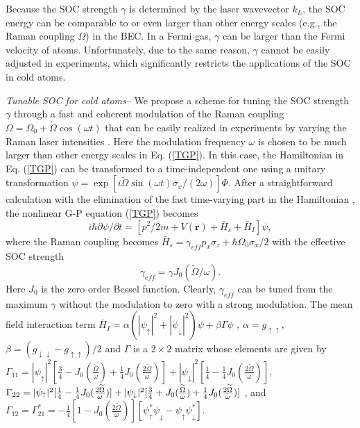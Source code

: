\documentclass[prl,twocolumn,superscriptaddress,showpacs,floatfix]{revtex4}
\begin{document}
Because the SOC strength $\gamma $ is determined by the laser wavevector $%
k_{L}$, the SOC energy can be comparable to or even larger than other energy
scales (e.g., the Raman coupling $\Omega $) in the BEC. In a Fermi gas, $%
\gamma $ can be larger than the Fermi velocity of atoms. Unfortunately, due
to the same reason, $\gamma $ cannot be easily adjusted in experiments,
which significantly restricts the applications of the SOC in cold atoms.

\textit{Tunable SOC for cold atoms}-- We propose a scheme for tuning the SOC
strength $\gamma $ through a fast and coherent modulation of the Raman
coupling $\Omega =\Omega _{0}+\widetilde{\Omega }\cos (\omega t)$ that can
be easily realized in experiments by varying the Raman laser intensities
\cite{Note}. Here the modulation frequency $\omega $ is chosen to be much
larger than other energy scales in Eq. (\ref{TGP}). In this case, the
Hamiltonian in Eq. (\ref{TGP}) can be transformed to a time-independent one
using a unitary transformation $\psi =\exp [i\widetilde{\Omega }\sin (\omega
t)\sigma _{x}/(2\omega )]\Phi $. After a straightforward calculation with
the elimination of the fast time-varying part in the Hamiltonian \cite%
{Eckardt,Lignier}, the nonlinear G-P equation (\ref{TGP}) becomes
\begin{equation}
i\hbar \partial \psi /\partial t=\left[ p^{2}/2m+V\left( \mathbf{r}\right) +%
\bar{H}_{s}+\bar{H}_{I}\right] \psi ,  \label{TCPS}
\end{equation}%
where the Raman coupling becomes $\bar{H}_{s}=\gamma _{eff}p_{x}\sigma
_{z}+\hbar \Omega _{0}\sigma _{x}/2$ with the effective SOC strength
\begin{equation}
\gamma _{eff}=\gamma J_{0}(\widetilde{\Omega }/\omega ).  \label{SOCS}
\end{equation}%
Here $J_{0}$ is the zero order Bessel function. Clearly, $\gamma _{eff}$ can
be tuned from the maximum $\gamma $ without the modulation to zero with a
strong modulation. The mean field interaction term $\bar{H}_{I}=\alpha
(|\psi _{\uparrow }|^{2}+|\psi _{\downarrow }|^{2})\psi +\beta \Gamma \psi $%
, $\alpha =g_{\uparrow \uparrow }$, $\beta =\left( g_{\downarrow \downarrow
}-g_{\uparrow \uparrow }\right) /2$ and $\Gamma $ is a $2\times 2$ matrix
whose elements are given by $\Gamma _{11}=|\psi _{\uparrow }|^{2}[\frac{3}{4}%
-J_{0}(\frac{\widetilde{\Omega }}{\omega })+\frac{1}{4}J_{0}(\frac{2%
\widetilde{\Omega }}{\omega })]+|\psi _{\downarrow }|^{2}[\frac{1}{4}-\frac{1%
}{4}J_{0}(\frac{2\widetilde{\Omega }}{\omega })]$, $\Gamma _{22}=|\psi
_{\uparrow }|^{2}[\frac{1}{4}-\frac{1}{4}J_{0}(\frac{2\widetilde{\Omega }}{%
\omega })]+|\psi _{\downarrow }|^{2}[\frac{3}{4}+J_{0}(\frac{\widetilde{%
\Omega }}{\omega })+\frac{1}{4}J_{0}(\frac{2\widetilde{\Omega }}{\omega })]$%
, and $\Gamma _{12}=\Gamma _{21}^{\ast }=-\frac{1}{4}[1-J_{0}(\frac{2%
\widetilde{\Omega }}{\omega })][\psi _{\uparrow }^{\ast }\psi _{\downarrow
}-\psi _{\uparrow }\psi _{\downarrow }^{\ast }]$.
\end{document}
